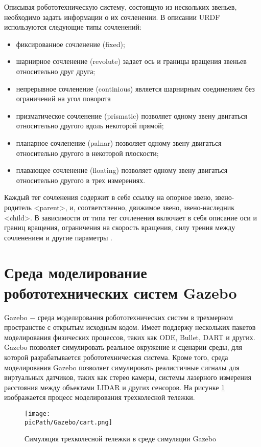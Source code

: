 \documentclass[oneside,final,14pt]{extreport}
\newcommand{\picPath}{img}
\begin{document}
Описывая робототехническую систему, состоящую из нескольких звеньев, необходимо задать информации о их сочленении. В описании URDF используются следующие типы сочленений:
\begin{itemize}
\item фиксированное сочленение (fixed);
\item шарнирное сочленение (revolute) задает ось и границы вращения звеньев относительно друг друга;
\item непрерывное сочленение  (continious) является шарнирным соединением без ограничений на угол поворота
\item призматическое сочленение (prismatic) позволяет одному звену двигаться относительно другого вдоль некоторой прямой;
\item планарное сочленение (palnar) позволяет одному звену двигаться относительно другого в некоторой плоскости;
\item плавающее сочленение (floating) позволяет одному звену двигаться относительно другого в трех измерениях.
\end{itemize} 

Каждый тег сочленения содержит в себе ссылку на опорное звено, звено-родитель <parent>, и, соответственно, движимое звено, звено-наследник <child>.  В зависимости от типа тег сочленения включает в себя описание оси и границ вращения, ограничения на скорость вращения, силу трения между сочленением и другие параметры \cite{ros.org}. 

\section{Среда моделирование робототехнических систем Gazebo}
\label{chap:Gazebo}
Gazebo $-$ среда моделирования робототехнических систем в трехмерном пространстве с открытым исходным кодом. Имеет поддержу нескольких пакетов моделирования физических процессов, таких как ODE, Bullet, DART и других. Gazebo позволяет симулировать реальное окружение и сценарии среды, для которой разрабатывается робототехническая система. Кроме того, среда моделирования Gazebo позволяет симулировать реалистичные сигналы для виртуальных датчиков, таких как стерео камеры, системы лазерного измерения расстояния между объектами LIDAR и других сенсоров.
На рисунке \ref{Figure:gazeboEx} изображается процесс моделирования трехколесной тележки. 

\begin{figure}[H]
\begin{center}
\texttt{[image: \\picPath/Gazebo/cart.png]}
\end{center}
  \caption{ Симуляция трехколесной тележки в среде симуляции Gazebo}
  \label{Figure:gazeboEx}
\end{figure}
\end{document}
